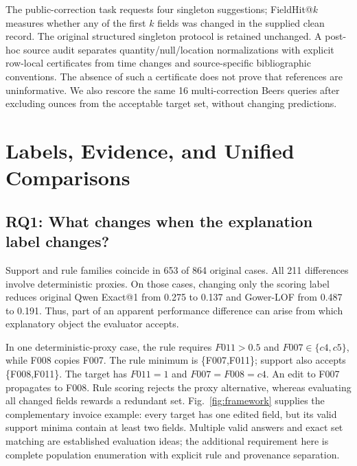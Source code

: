\documentclass[conference]{IEEEtran}
\begin{document}
The public-correction task requests four singleton suggestions; FieldHit@$k$ measures whether any of the first $k$ fields was changed in the supplied clean record. The original structured singleton protocol is retained unchanged. A post-hoc source audit separates quantity/null/location normalizations with explicit row-local certificates from time changes and source-specific bibliographic conventions. The absence of such a certificate does not prove that references are uninformative. We also rescore the same 16 multi-correction Beers queries after excluding ounces from the acceptable target set, without changing predictions.

\section{Labels, Evidence, and Unified Comparisons}
\subsection{RQ1: What changes when the explanation label changes?}
Support and rule families coincide in 653 of 864 original cases. All 211 differences involve deterministic proxies. On those cases, changing only the scoring label reduces original Qwen Exact@1 from 0.275 to 0.137 and Gower-LOF from 0.487 to 0.191. Thus, part of an apparent performance difference can arise from which explanatory object the evaluator accepts.

In one deterministic-proxy case, the rule requires $F011>0.5$ and $F007\in\{c4,c5\}$, while F008 copies F007. The rule minimum is \{F007,F011\}; support also accepts \{F008,F011\}. The target has $F011=1$ and $F007=F008=c4$. An edit to F007 propagates to F008. Rule scoring rejects the proxy alternative, whereas evaluating all changed fields rewards a redundant set. Fig.~\ref{fig:framework} supplies the complementary invoice example: every target has one edited field, but its valid support minima contain at least two fields. Multiple valid answers and exact set matching are established evaluation ideas; the additional requirement here is complete population enumeration with explicit rule and provenance separation.
\end{document}
